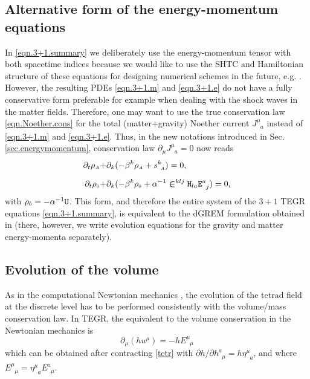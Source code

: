 \documentclass[
10pt, %
a4paper, %
oneside, %
headinclude,footinclude, %
BCOR5mm, %
]{scrartcl}
\newcommand{\sA}{\mathsmaller A}
\newcommand{\pd}[1]{\partial_{#1}}
\newcommand{\tetrsymbol}{h}
\newcommand{\itetrsymbol}{\eta}
\newcommand{\itetr}[2]{\itetrsymbol^{#1}_{\phantom{#1}#2}}
\newcommand{\tetr}[2]{\tetrsymbol^{#1}_{\phantom{#1}#2}}
\newcommand{\stress}[2]{s_{\ #1}^{#2}}
\newcommand{\detTetr}{\tetrsymbol}
\newcommand{\ET}[2]{E^{#1}_{\phantom{#1}#2}}	%
\newcommand{\Hfin}[2]{\mathtt{H}_{#2#1}}	%
\newcommand{\Efin}[2]{\mathtt{E}^{#1}_{\phantom{#1}#2}}	%
\newcommand{\Ufin}{\mathtt{U}}
\newcommand{\LCsymb}{\bm{\in}}    %
\newcommand{\NC}[2]{J^{#2}_{\phantom{#2}#1}}
\newcommand{\indalg}[1]{\hat{\mathsmaller{#1}}}
\newcommand{\shift}[1]{\beta^{#1}}
\begin{document}
\subsection{Alternative form of the energy-momentum equations}

In \eqref{eqn.3+1.summary} we deliberately use the energy-momentum tensor with both spacetime 
indices because we would like to use the SHTC and Hamiltonian structure \cite{SHTC-GENERIC-CMAT} of 
these equations for designing numerical schemes in the future, e.g. \cite{HTC2022,SPH_SHTC}. 
However, the resulting PDEs 
\eqref{eqn.3+1.m} and \eqref{eqn.3+1.e} do not have a fully 
conservative form preferable for example when dealing with the shock waves in the matter fields.
Therefore, one may want to use the true conservation law \eqref{eqn.Noether.cons} for the total 
(matter+gravity) Noether 
current $ \NC{a}{\mu} $ instead of \eqref{eqn.3+1.m} and \eqref{eqn.3+1.e}. Thus, in the new 
notations introduced in Sec.\,\ref{sec.energymomentum}, conservation law $ \pd{\mu}\NC{a}{\mu} = 0 
$ now reads
\begin{subequations}
	\begin{align}
		\pd{t} \rho_\sA + & \pd{k} (-\shift{k} \rho_\sA + \stress{\sA}{k}) = 0,\\[2mm]
		\pd{t} \rho_{\indalg{0}} + & \pd{k} (-\shift{k} \rho_{\indalg{0}} + \alpha^{-1} 
		\LCsymb^{klj}\Hfin{a}{l}\Efin{a}{j}) = 0,
	\end{align}
\end{subequations}
with $ \rho_{\indalg{0}} = -\alpha^{-1} \Ufin $. This form, and therefore the entire system of the 
$ 3+1 $ TEGR equations \eqref{eqn.3+1.summary},  is equivalent to the 
dGREM formulation obtained in \cite{Olivares2022} (there, however, we write evolution 
equations for the gravity and matter energy-momenta separately).



\subsection{Evolution of the volume}

As in the computational Newtonian mechanics \cite{DPRZ2016,SIGPR2021}, the evolution of the tetrad 
field at the discrete level has to be performed consistently with the volume/mass conservation law. 
In 
TEGR, the equivalent to the volume conservation in the Newtonian mechanics is 
\begin{equation}\label{eqn.pde.det}
	\pd{\mu}(\detTetr u^\mu) = -\detTetr \ET{\mu}{\mu} 
\end{equation} 
which can be obtained after contracting \eqref{tetr} with $ \partial \detTetr/\partial \tetr{a}{\mu} 
= \detTetr
\itetr{\mu}{a} $, and where $ \ET{\mu}{\mu} = \itetr{\mu}{a} \ET{a}{\mu}$.
\end{document}
